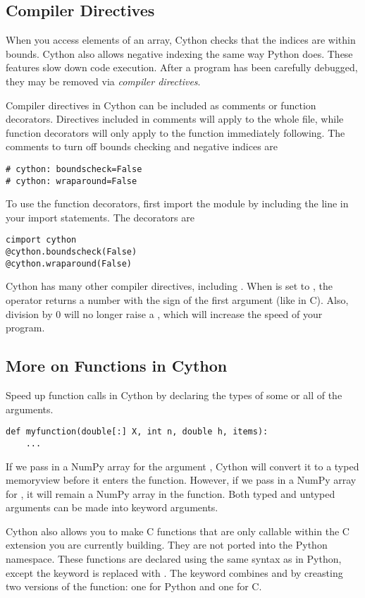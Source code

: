 \subsection*{Compiler Directives}
When you access elements of an array, Cython checks that the indices are within bounds.
Cython also allows negative indexing the same way Python does.
These features slow down code execution.
After a program has been carefully debugged, they may be removed via \emph{compiler directives}.

Compiler directives in Cython can be included as comments or function decorators.
Directives included in comments will apply to the whole file, while function decorators will only apply to the function immediately following.
The comments to turn off bounds checking and negative indices are
\begin{lstlisting}
# cython: boundscheck=False
# cython: wraparound=False
\end{lstlisting}
To use the function decorators, first import the  module by including the line  in your import statements.
The decorators are
\begin{lstlisting}
cimport cython
@cython.boundscheck(False)
@cython.wraparound(False)
\end{lstlisting}

Cython has many other compiler directives, including .
When  is set to , the \li{\%} operator returns a number with the sign of the first argument (like in C).
Also, division by 0 will no longer raise a , which will increase the speed of your program.

\subsection*{More on Functions in Cython}
Speed up function calls in Cython by declaring the types of some or all of the arguments.
\begin{lstlisting}
def myfunction(double[:] X, int n, double h, items):
    ...
\end{lstlisting}
If we pass in a NumPy array for the argument , Cython will convert it to a typed memoryview before it enters the function.
However, if we pass in a NumPy array for , it will remain a NumPy array in the function.
Both typed and untyped arguments can be made into keyword arguments.

Cython also allows you to make C functions that are only callable within the C extension you are currently building.
They are not ported into the Python namespace.
These functions are declared using the same syntax as in Python, except the keyword  is replaced with .
The keyword  combines  and  by creasting two versions of the function: one for Python and one for C.

